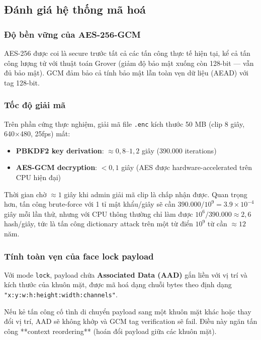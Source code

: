 \subsection{Đánh giá hệ thống mã hoá}
\label{subsec:encryption_eval}

\subsubsection{Độ bền vững của AES-256-GCM}

AES-256 được coi là secure trước tất cả các tấn công thực tế hiện tại, kể cả tấn công lượng tử với thuật toán Grover (giảm độ bảo mật xuống còn 128-bit --- vẫn đủ bảo mật). GCM đảm bảo cả tính bảo mật lẫn toàn vẹn dữ liệu (AEAD) với tag 128-bit.

\subsubsection{Tốc độ giải mã}

Trên phần cứng thực nghiệm, giải mã file \texttt{.enc} kích thước 50 MB (clip 8 giây, 640×480, 25fps) mất:
\begin{itemize}
    \item \textbf{PBKDF2 key derivation}: $\approx 0{,}8$--$1{,}2$ giây (390.000 iterations)
    \item \textbf{AES-GCM decryption}: $< 0{,}1$ giây (AES được hardware-accelerated trên CPU hiện đại)
\end{itemize}
Thời gian chờ $\approx 1$ giây khi admin giải mã clip là chấp nhận được. Quan trọng hơn, tấn công brute-force với 1 tỉ mật khẩu/giây sẽ cần $390.000 / 10^9 = 3.9 \times 10^{-4}$ giây mỗi lần thử, nhưng với CPU thông thường chỉ làm được $10^6 / 390.000 \approx 2{,}6$ hash/giây, tức là tấn công dictionary attack trên một từ điển $10^9$ từ cần $\approx 12$ năm.

\subsubsection{Tính toàn vẹn của face lock payload}

Với mode \texttt{lock}, payload chứa \textbf{Associated Data (AAD)} gắn liền với vị trí và kích thước của khuôn mặt, được mã hoá dạng chuỗi bytes theo định dạng \texttt{"x:y:\allowbreak{}w:h:\allowbreak{}height:\allowbreak{}width:\allowbreak{}channels"}.

Nếu kẻ tấn công cố tình di chuyển payload sang một khuôn mặt khác hoặc thay đổi vị trí, AAD sẽ không khớp và GCM tag verification sẽ fail. Điều này ngăn tấn công **context reordering** (hoán đổi payload giữa các khuôn mặt).

